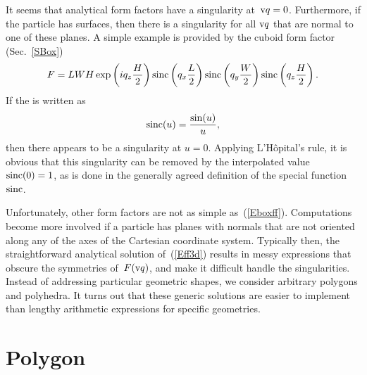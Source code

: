 %
It seems that  analytical form factors have a singularity at~$\text{v}{q}=0$.
Furthermore, if the particle has  surfaces,
then there is a singularity for all $\text{v}{q}$ that are normal to one of these planes.
A simple example is provided by the cuboid form factor (Sec.~\ref{SBox})
\begin{equation}\label{Eboxff}
F= L W H\exp\left(i q_z \frac{H}{2}\right) \operatorname{sinc}\left(q_x \frac{L}{2}\right)
\operatorname{sinc}\left(q_y \frac{W}{2}\right) \operatorname{sinc}\left(q_z \frac{H}{2}\right).
\end{equation}
If the  is written as
\begin{equation}\label{Esinc}
  \operatorname{sinc}(u) = \frac{\sin(u)}{u},
\end{equation}
then there appears to be a singularity at $u=0$.
Applying L'H\^opital's rule, it is obvious
that this singularity can be removed by the interpolated value
$\operatorname{sinc}(0)=1$,
as is done in the generally agreed definition of the special function~$\operatorname{sinc}$.

Unfortunately, other form factors are not as simple as~(\ref{Eboxff}).
Computations become more involved
if a particle has planes with normals that are not oriented along
any of the axes of the Cartesian coordinate system.
Typically then, the straightforward analytical solution of~(\ref{Eff3d})
results in messy expressions that obscure the symmetries of~$F(\text{v}{q})$,
and make it difficult handle the singularities.
Instead of addressing particular geometric shapes,
we consider arbitrary polygons and polyhedra.
It turns out that these generic solutions
are easier to implement
than lengthy arithmetic expressions for specific geometries.



\section{Polygon}\label{SFFPolygon}

%
\def\R{\v{R}}
\let\textE=\E
\def\E{\v{E}}
\def\Gp{\Gamma_\parallel}
\def\x{\v{x}}
\def\V{\v{V}}
\def\qp{\v{p}}
\def\n{\v{\hat n}}
\def\uq{\v{\hat q}}
\def\uqp{\v{\hat p}}

